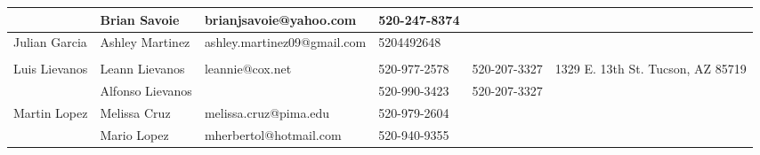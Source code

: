 \documentclass[landscape]{article}\usepackage[]{graphicx}\usepackage[]{color}
\begin{document}
\begin{longtable}{|p{100pt}|p{100pt}|p{140pt}|p{60pt}|p{64pt}|p{120pt}|}
 & Brian Savoie & brianjsavoie@yahoo.com & 520-247-8374 &  & \\
\hline
\multirow{2}{100pt}{Julian Garcia} & Ashley Martinez & ashley.martinez09@gmail.com & 5204492648 &  & \multirow{2}{120pt}{} \\
 &  &  &  &  & \\
\hline
\multirow{2}{100pt}{Luis Lievanos} & Leann Lievanos & leannie@cox.net & 520-977-2578 & 520-207-3327 & \multirow{2}{120pt}{1329 E. 13th St. Tucson, AZ 85719} \\
 & Alfonso Lievanos &  & 520-990-3423 & 520-207-3327 & \\
\hline
\multirow{2}{100pt}{Martin Lopez} & Melissa Cruz & melissa.cruz@pima.edu & 520-979-2604 &  & \multirow{2}{120pt}{} \\
 & Mario Lopez & mherbertol@hotmail.com & 520-940-9355 &  & \\
\hline
\end{longtable}
\newpage
\end{document}

